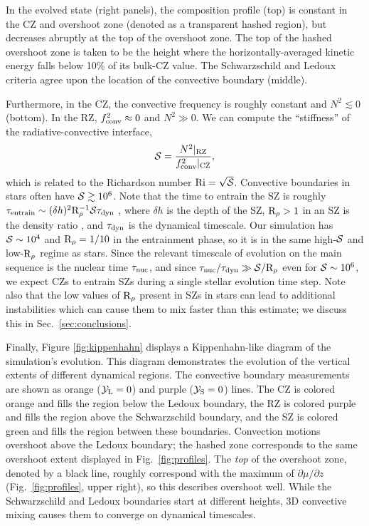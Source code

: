 In the evolved state (right panels), the composition profile (top) is constant in the CZ and overshoot zone (denoted as a transparent hashed region), but decreases abruptly at the top of the overshoot zone.
The top of the hashed overshoot zone is taken to be the height where the horizontally-averaged kinetic energy falls below 10\% of its bulk-CZ value.
The Schwarzschild and Ledoux criteria agree upon the location of the convective boundary (middle).

Furthermore, in the CZ, the convective frequency is roughly constant and $N^2 \lesssim 0$ (bottom).
In the RZ, $f_{\rm{conv}}^2 \approx 0$ and $N^2 \gg 0$.
We can compute the ``stiffness'' of the radiative-convective interface,
\begin{equation}
\mS = \frac{N^2|_{\rm{RZ}}}{f_{\rm{conv}}^2|_{\rm{CZ}}},
\label{eqn:stiffness}
\end{equation}
which is related to the Richardson number $\rm{Ri} = \sqrt{\mathcal{S}}$.
Convective boundaries in stars often have $\mathcal{S} \gtrsim 10^6$.
Note that the time to entrain the SZ is roughly $\tau_{\rm{entrain}} \sim (\delta h)^2 \rm{R}_{\rho}^{-1} \mathcal{S} \tau_{\rm{dyn}}$ \citep[per][eqn.~3]{fuentes_cumming_2020}, where $\delta h$ is the depth of the SZ, $\rm{R}_{\rho} > 1$ in an SZ is the density ratio \citep[see][eqn.~7]{garaud_2018}, and $\tau_{\rm{dyn}}$ is the dynamical timescale.
Our simulation has $\mathcal{S} \sim 10^{4}$ and $\rm{R}_\rho = 1/10$ in the entrainment phase, so it is in the same high-$\mathcal{S}$ and low-$\rm{R}_\rho$ regime as stars.
Since the relevant timescale of evolution on the main sequence is the nuclear time $\tau_{\rm{nuc}}$, and since $\tau_{\rm{nuc}}/\tau_{\rm{dyn}} \gg \mathcal{S}/\mathrm{R}_{\rho}$ even for $\mathcal{S} \sim 10^6$, we expect CZs to entrain SZs during a single stellar evolution time step.
Note also that the low values of $\mathrm{R}_{\rho}$ present in SZs in stars can lead to additional instabilities which can cause them to mix faster than this estimate; we discuss this in Sec.~\ref{sec:conclusions}.

Finally, Figure \ref{fig:kippenhahn} displays a Kippenhahn-like diagram of the simulation's evolution.
This diagram demonstrates the evolution of the vertical extents of different dynamical regions.
The convective boundary measurements are shown as orange ($\mathcal{Y}_{\rm{L}} = 0$) and purple ($\mathcal{Y}_{\rm{S}} = 0$) lines.
The CZ is colored orange and fills the region below the Ledoux boundary, the RZ is colored purple and fills the region above the Schwarzschild boundary, and the SZ is colored green and fills the region between these boundaries.
Convection motions overshoot above the Ledoux boundary; the hashed zone corresponds to the same overshoot extent displayed in Fig.~\ref{fig:profiles}.
The \emph{top} of the overshoot zone, denoted by a black line, roughly correspond with the maximum of $\partial\mu/\partial z$ (Fig.~\ref{fig:profiles}, upper right), so this describes overshoot well.
While the Schwarzschild and Ledoux boundaries start at different heights, 3D convective mixing causes them to converge on dynamical timescales.


